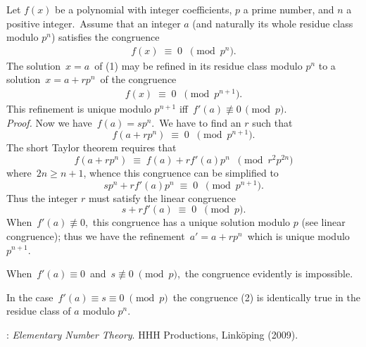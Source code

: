 \documentclass[12pt]{article}
\begin{document}
Let $f(x)$ be a polynomial with integer coefficients, $p$ a prime number, and $n$ a positive integer.\, Assume that an integer $a$ (and naturally its whole residue class modulo $p^n$) satisfies the congruence
\begin{align}
f(x) \;\equiv\; 0 \;\; \pmod{p^n}.
\end{align}
The solution\, $x = a$\, of (1) may be refined in its residue class modulo $p^n$ to a solution\, $x = a\!+\!rp^n$\, of the congruence
\begin{align}
f(x) \;\equiv\; 0 \;\; \pmod{p^{n+1}}.
\end{align}
This refinement is unique modulo $p^{n+1}$ iff\, $f'(a) \not\equiv 0\, \pmod{p}$.\\

{\it Proof.}\; Now we have\, $f(a) = sp^n$.\, We have to find an $r$ such that
$$f(a\!+\!rp^n) \;\equiv\; 0 \;\; \pmod{p^{n+1}}.$$
The short Taylor theorem requires that
$$f(a\!+\!rp^n) \;\equiv\; f(a)+rf'(a)p^n \;\; 
\pmod{r^2p^{2n}}$$
where\, $2n \ge n\!+\!1$, whence this congruence can be simplified to
$$sp^n+rf'(a)p^n \;\equiv\; 0 \;\; \pmod{p^{n+1}}.$$
Thus the integer $r$ must satisfy the linear congruence
$$s+rf'(a) \;\equiv\; 0 \;\; \pmod{p}.$$
When\, $f'(a) \not\equiv 0$,\, this congruence has a unique solution modulo $p$ (see linear congruence); thus we have the refinement\, 
$a' = a\!+\!rp^n$\, which is unique modulo $p^{n+1}$.

When\, $f'(a) \equiv 0$\, and\, $s \not\equiv 0 \; \pmod{p}$,\, the congruence evidently is impossible.

In the case\, $f'(a) \equiv s \equiv 0 \; \pmod{p}$\, the congruence (2) is identically true in the residue class of $a$ modulo $p^n$. \qquad \Box




\begin{thebibliography}{8}
: {\em Elementary Number Theory}. HHH Productions, Link\"oping (2009).
\end{thebibliography} 
\end{document}
